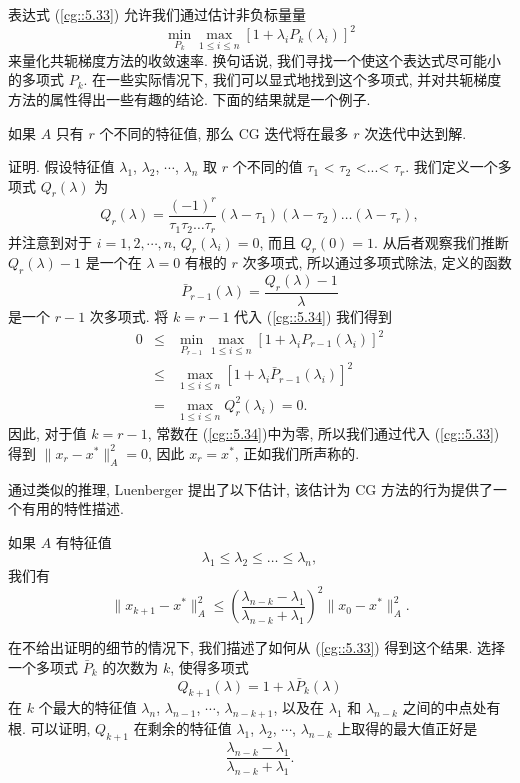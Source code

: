 \documentclass[a4paper]{ctexart}
\newcommand{\hl}[1]
{\noindent {\bf {#1}}}
\begin{document}
{表达式 (\ref{cg::5.33}) 允许我们通过估计非负标量量
\begin{equation}
  \min_{P_k} \max_{1 \leq i \leq n} [1 + \lambda_i P_k (\lambda_i)]^2
  \label{cg::5.34}
\end{equation}
来量化共轭梯度方法的收敛速率. 换句话说, 我们寻找一个使这个表达式尽可能小的多项式 $P_k$.
在一些实际情况下, 我们可以显式地找到这个多项式, 
并对共轭梯度方法的属性得出一些有趣的结论. 下面的结果就是一个例子.

\hl{定理 4}
如果 $A$ 只有 $r$ 个不同的特征值, 那么 CG 迭代将在最多 $r$ 次迭代中达到解.

证明. 假设特征值 $\lambda_1$, $\lambda_2$, $\cdots$, $\lambda_n$ 
取 $r$ 个不同的值 $\tau_1$ < $\tau_2$ <...< $\tau_r$. 
我们定义一个多项式 $Q_r(\lambda)$ 为
$$
Q_r(\lambda) = \frac{(-1)^r}{\tau_1\tau_2\ldots\tau_r} 
(\lambda - \tau_1)(\lambda - \tau_2)\ldots(\lambda - \tau_r),
$$
并注意到对于 $i = 1, 2,\cdots, n$, 
$Q_r(\lambda_i) = 0$, 而且 $Q_r(0) = 1$. 
从后者观察我们推断 $Q_r(\lambda) - 1$ 是一个在 $\lambda = 0$ 有根的 $r$ 次多项式, 
所以通过多项式除法, 定义的函数
$$
\bar{P}_{r-1} (\lambda) = \frac{Q_r(\lambda) - 1}{\lambda}
$$
是一个 $r - 1$ 次多项式. 将 $k = r - 1$ 代入 (\ref{cg::5.34}) 
我们得到
$$
\begin{array}{rcl}
0 &\leq& \min_{P_{r-1}} \max_{1 \leq i \leq n} [1 + \lambda_i P_{r-1} (\lambda_i)]^2 \\
&\leq& \max_{1 \leq i \leq n} [1 + \lambda_i \bar{P}_{r-1} (\lambda_i)]^2 \\
&=& \max_{1 \leq i \leq n} Q_r^2 (\lambda_i) = 0. 
\end{array}
$$
因此, 对于值 $k = r - 1$, 常数在 (\ref{cg::5.34})中为零, 
所以我们通过代入 (\ref{cg::5.33}) 得到 $\|x_r - x^*\|_A^2 = 0$, 因此 $x_r = x^*$, 
正如我们所声称的.

通过类似的推理, Luenberger 提出了以下估计, 该估计为 CG 方法的行为提供了一个有用的特性描述.

\hl{定理 5}
如果 $A$ 有特征值 
$$
\lambda_1 \leq \lambda_2 \leq \ldots \leq \lambda_n,
$$
我们有
\begin{equation}
\|x_{k+1} - x^*\|^2_A 
\leq \left(\frac{\lambda_{n-k} - \lambda_1}{\lambda_{n-k} + \lambda_1}\right)^2\|x_0 - x^*\|^2_A.
\label{cg::5.35}
\end{equation}

在不给出证明的细节的情况下, 我们描述了如何从 (\ref{cg::5.33}) 得到这个结果. 
选择一个多项式 $\bar{P}_{k}$ 的次数为 $k$, 使得多项式 
$$
Q_{k+1}(\lambda) = 1 + \lambda \bar{P}_{k} (\lambda)
$$ 
在 $k$ 个最大的特征值 
$\lambda_n$, $\lambda_{n-1}$, $\cdots$, $\lambda_{n-k+1}$, 
以及在 $\lambda_1$ 和 $\lambda_{n-k}$ 之间的中点处有根. 
可以证明, $Q_{k+1}$ 在剩余的特征值 $\lambda_1$, $\lambda_2$, $\cdots$, $\lambda_{n-k}$ 
上取得的最大值正好是 
$$
\frac{\lambda_{n-k} - \lambda_1}{\lambda_{n-k} + \lambda_1}.
$$

}
\end{document}
